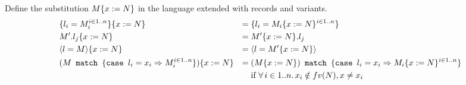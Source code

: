 \subsection{}

Define the substitution $M\{x:=N\}$ in the language extended with records and variants.
\begin{align*}
	 & \{l_i=M_i^{i \in 1..n}\}\{x:=N\}                     & =\; & \{l_i=M_i\{x:=N\}^{i \in 1..n}\}                                 \\
	 & M'.l_j\{x:=N\}                                  & =\; & M'\{x:=N\}.l_j                                              \\
	 & \langle l=M \rangle\{x:=N\}                                      & =\; & \langle l=M'\{x:=N\} \rangle                                                 \\
	 & (M\texttt{ match }\{\texttt{case }l_i = x_i \Rightarrow M_i^{i \in 1..n}\})\{x:=N\} & =\; & (M\{x:=N\})\texttt{ match }\{\texttt{case }l_i = x_i \Rightarrow M_i\{x:=N\}^{i \in 1..n}\} \\
	 &                                                            &     & \text{if }\forall\, i \in 1..n.\,x_i \notin fv(N), x \ne x_i
\end{align*}
